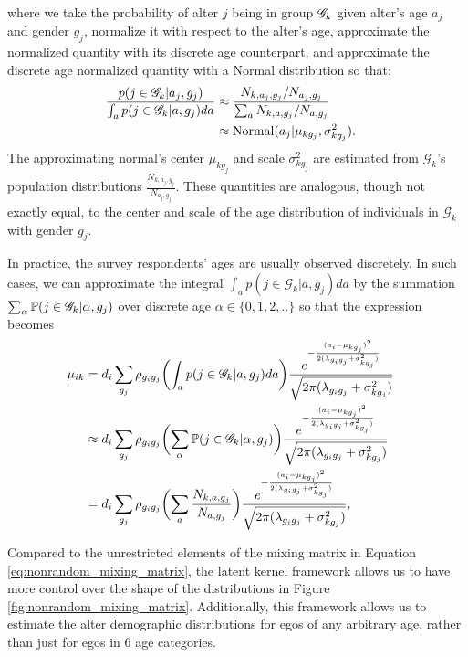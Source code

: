 where we take the probability of alter $j$ being in group $\mathcal{G}_k$ given alter's age $a_j$ and gender $g_j$, normalize it with respect to the alter's age, approximate the normalized quantity with its discrete age counterpart, and approximate the discrete age normalized quantity with a Normal distribution so that:
\begin{align}
\frac{ p( j \in \mathcal{G}_k | a_j, g_j) }{ \int_{a} p( j \in \mathcal{G}_k | a, g_j) da } 
&\approx  \frac{ N_{k, a_j, g_j} / N_{a_j, g_j} } { \sum_a N_{k, a, g_j} / N_{a, g_j} } && \label{eq:subpopulation_normal_approx} \\\nonumber
&\approx  \text{Normal}(a_j | \mu_{kg_j}, \sigma_{kg_j}^2).
\end{align}
The approximating normal's center $\mu_{kg_j}$ and scale $\sigma_{kg_j}^2$ are estimated from $\mathcal{G}_k$'s population distributions $\frac{N_{k,a_j,g_j}}{N_{a_j,g_j}}$. These quantities are analogous, though not exactly equal, to the center and scale of the age distribution of individuals in $\mathcal{G}_k$ with gender $g_j$. 

In practice, the survey respondents' ages are usually observed discretely. In such cases, we can approximate the integral $\int_{a} p( j \in \mathcal{G}_k | a, g_j) da$ by the summation $\sum_\alpha \mathbb{P}( j \in \mathcal{G}_k | \alpha, g_j)$ over discrete age $\alpha \in \{0,1,2,..\}$ so that the expression becomes
\begin{align}
\mu_{ik} 
&= d_i \sum_{g_j} \rho_{g_ig_j} 
\biggl( \int_{a} p( j \in \mathcal{G}_k | a, g_j) da \biggr) 
\frac{ e^{ -\frac{ (a_i - \mu_{kg_j})^2 }{ 2(\lambda_{g_ig_j} + \sigma_{kg_j}^2) } } }{ \sqrt{ 2\pi(\lambda_{g_ig_j} + \sigma_{kg_j}^2) } } && \\\nonumber
&\approx d_i \sum_{g_j} \rho_{g_ig_j} 
\biggl( \sum_\alpha \mathbb{P}( j \in \mathcal{G}_k | \alpha, g_j) \biggr) 
\frac{ e^{ -\frac{ (a_i - \mu_{kg_j})^2 }{ 2(\lambda_{g_ig_j} + \sigma_{kg_j}^2) } } }{ \sqrt{ 2\pi(\lambda_{g_ig_j} + \sigma_{kg_j}^2) } } && \\\nonumber
&= d_i \sum_{g_j} \rho_{g_ig_j} 
\biggl( \sum_{a} \frac{ N_{k, a, g_j} }{ N_{a, g_j} } \biggr) 
\frac{ e^{ -\frac{ (a_i - \mu_{kg_j})^2 }{ 2(\lambda_{g_ig_j} + \sigma_{kg_j}^2) } } }{ \sqrt{ 2\pi(\lambda_{g_ig_j} + \sigma_{kg_j}^2) } },
\end{align}

Compared to the unrestricted elements of the \citet{McCormick+others:2010} mixing matrix in Equation \ref{eq:nonrandom_mixing_matrix}, the latent kernel framework allows us to have more control over the shape of the distributions in Figure \ref{fig:nonrandom_mixing_matrix}. Additionally, this framework allows us to estimate the alter demographic distributions for egos of any arbitrary age, rather than just for egos in 6 age categories.

